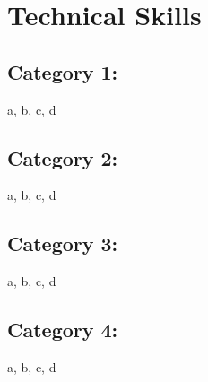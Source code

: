 \section*{Technical Skills}

\subsection*{Category 1:} a, b, c, d 
\subsection*{Category 2:} a, b, c, d
\subsection*{Category 3:} a, b, c, d
\subsection*{Category 4:} a, b, c, d
